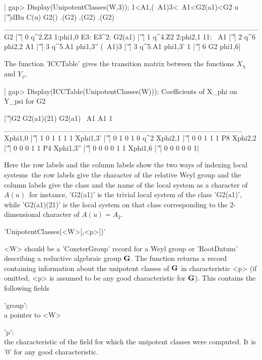 |    gap> Display(UnipotentClasses(W,3));
    1<A1,(~A1)3<~A1<G2(a1)<G2
         u |'\|'|dBu   C(u)       G2() .(G2) .(G2) .(G2)
    ________________________________________________
    G2     |'\|'|  0 q^2.Z3 1:phi{1,0}         E3: E3^2:
    G2(a1) |'\|'|  1 q^4.Z2 2:phi{2,1}   11:
    ~A1    |'\|'|  2    q^6   phi{2,2}
    A1     |'\|'|  3 q^5.A1 phi{1,3}''
    (~A1)3 |'\|'|  3 q^5.A1  phi{1,3}'
    1      |'\|'|  6     G2   phi{1,6}|

The  function 'ICCTable' gives the  transition matrix between the functions
$X_\chi$  and $Y_\psi$.

|    gap> Display(ICCTable(UnipotentClasses(W)));
    Coefficients of X_phi on Y_psi for G2

                |'\|'|G2 G2(a1)(21) G2(a1) ~A1 A1   1
    _____________________________________________
    Xphi{1,0}   |'\|'| 1          0      1   1  1   1
    Xphi{1,3}'  |'\|'| 0          1      0   1  0 q^2
    Xphi{2,1}   |'\|'| 0          0      1   1  1  P8
    Xphi{2,2}   |'\|'| 0          0      0   1  1  P4
    Xphi{1,3}'' |'\|'| 0          0      0   0  1   1
    Xphi{1,6}   |'\|'| 0          0      0   0  0   1|

Here  the row labels  and the column  labels show the  two ways of indexing
local  systems\:\ the  row labels  give the  character of the relative Weyl
group and the column labels give the class and the name of the local system
as  a character  of $A(u)$\:\  for instance,  'G2(a1)' is the trivial local
system  of the  class 'G2(a1)',  while 'G2(a1)(21)'  is the local system on
that class corresponding to the 2-dimensional character of $A(u)=A_2$.


'UnipotentClasses(<W>[,<p>])'

<W>  should  be  a  'CoxeterGroup'  record  for a Weyl group or 'RootDatum'
describing a reductive algebraic group ${\bf G}$. The function returns a record
containing   information   about   the   unipotent   classes  of  ${\bf G}$  in
characteristic   <p>  (if   omitted,  <p>   is  assumed   to  be  any  good
characteristic for ${\bf G}$). This contains the following fields\:

'group':\\ a pointer to <W>

'p':\\ the characteristic of the field for which the unipotent classes were
computed. It is '0' for any good characteristic.

